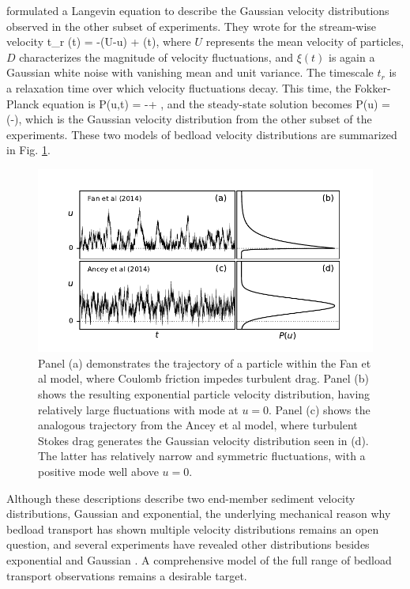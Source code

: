 \citet{Ancey2014} formulated a Langevin equation to describe the Gaussian velocity distributions observed in the other subset of experiments. They wrote for the stream-wise velocity 
\be t_r (t) = -(U-u) + \xi(t),\ee
where $U$ represents the mean velocity of particles, $D$ characterizes the magnitude of velocity fluctuations, and $\xi(t)$ is again a Gaussian white noise with vanishing mean and unit variance. The timescale $t_r$ is a relaxation time over which velocity fluctuations decay. This time, the Fokker-Planck equation is
\be {} P(u,t) = - + ,\ee 
and the steady-state solution becomes
\be P(u) =  \exp\Big(-\Big), \ee
which is the Gaussian velocity distribution from the other subset of the experiments.
These two models of bedload velocity distributions are summarized in Fig. \ref{fig:fanAncey}.
\begin{figure}[!htbp]
	\includegraphics[width=\linewidth,keepaspectratio]{./figures/ch1/fanAncey.pdf}
	\caption{Panel (a) demonstrates the trajectory of a particle within the Fan et al model, where Coulomb friction impedes turbulent drag. Panel (b) shows the resulting exponential particle velocity distribution, having relatively large fluctuations with mode at $u=0$.
	Panel (c) shows the analogous trajectory from the Ancey et al model, where turbulent Stokes drag generates the Gaussian velocity distribution seen in (d). The latter has relatively narrow and symmetric fluctuations, with a positive mode well above $u=0$.}
	\label{fig:fanAncey}
\end{figure}
Although these descriptions describe two end-member sediment velocity distributions, Gaussian and exponential, the underlying mechanical reason why bedload transport has shown multiple velocity distributions remains an open question, and several experiments have revealed other distributions besides exponential and Gaussian \citep[e.g.][]{Houssais2012,Liu2019}.
A comprehensive model of the full range of bedload transport observations remains a desirable target.

